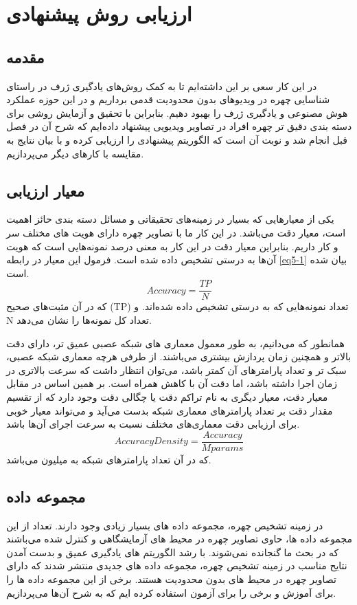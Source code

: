 \chapter{ارزیابی روش پیشنهادی}
\section{مقدمه}

در این کار سعی بر این داشته‌ایم تا به کمک روش‌های یادگیری ژرف در راستای شناسایی چهره در ویدیوهای بدون محدودیت قدمی برداریم و در این حوزه عملکرد هوش مصنوعی و یادگیری ژرف را بهبود دهیم. بنابراین با تحقیق و آزمایش روشی برای دسته بندی دقیق تر چهره افراد در تصاویر ویدیویی پیشنهاد داده‌ایم که شرح آن در فصل قبل انجام شد و نوبت آن است که الگوریتم پیشنهادی را ارزیابی کرده و با بیان نتایج به مقایسه با کارهای دیگر می‌پردازیم.
\section{معیار ارزیابی}

یکی از معیارهایی که بسیار در زمینه‌های تحقیقاتی و مسائل دسته بندی حائز اهمیت است، معیار دقت می‌باشد. در این کار ما با تصاویر چهره دارای هویت های مختلف سر و کار داریم. بنابراین معیار دقت در این کار به معنی درصد نمونه‌هایی است که هویت آن‌ها به درستی تشخیص داده شده است. فرمول این معیار در رابطه \ref{eq5-1} بیان شده است.
\begin{equation}\label{eq5-1}
Accuracy= \frac{TP}{N}
\end{equation}
که در آن 	مثبت‌های صحیح (TP) تعداد نمونه‌هایی که به درستی تشخیص داده شده‌اند. و N تعداد کل نمونه‌ها را نشان می‌دهد.

همانطور که می‌دانیم، به طور معمول معماری های شبکه عصبی عمیق تر، دارای دقت بالاتر و همچنین زمان پردازش بیشتری می‌باشند. از طرفی هرچه معماری شبکه عصبی، سبک تر و تعداد پارامترهای آن کمتر باشد، می‌توان انتظار داشت که سرعت بالاتری در زمان اجرا داشته باشد، اما دقت آن با کاهش همراه است. بر همین اساس در مقابل معیار دقت، معیار دیگری به نام تراکم دقت یا چگالی دقت وجود دارد که از تقسیم مقدار دقت بر تعداد پارامترهای معماری شبکه بدست می‌آید و می‌تواند معیار خوبی برای ارزیابی دقت معماری‌های مختلف نسبت به سرعت اجرای آن‌ها باشد.
‌\begin{equation}\label{eq5-2}
Accuracy Density = \frac{Accuracy}{Mparams}
\end{equation}
که در آن  تعداد پارامترهای شبکه به میلیون می‌باشد.
\section{مجموعه داده}
در زمینه تشخیص چهره، مجموعه داده های بسیار زیادی وجود دارند. تعداد از این مجموعه داده ها، حاوی تصاویر چهره در محیط های آزمایشگاهی و کنترل شده می‌باشند که در بحث ما گنجانده نمی‌شوند. با رشد الگوریتم های یادگیری عمیق و بدست آمدن نتایح مناسب در زمینه تشخیص چهره، مجموعه داده های جدیدی منتشر شدند که دارای تصاویر چهره در محیط های بدون محدودیت هستند. برخی از این مجموعه داده ها را برای آموزش و برخی را برای آزمون استفاده کرده ایم که به شرح آن‌ها می‌پردازیم.
